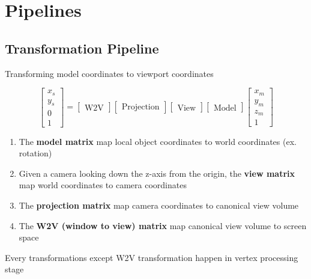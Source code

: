 \chapter{Pipelines}

\section{Transformation Pipeline}

  Transforming model coordinates to viewport coordinates

  \begin{equation}
    \begin{bmatrix}
      x_{s} \\
      y_{s} \\
      0 \\
      1
    \end{bmatrix}
    =
    \begin{bmatrix}
      \text{W2V}
    \end{bmatrix}
    \begin{bmatrix}
      \text{Projection}
    \end{bmatrix}
    \begin{bmatrix}
      \text{View}
    \end{bmatrix}
    \begin{bmatrix}
      \text{Model}
    \end{bmatrix}
    \begin{bmatrix}
      x_{m} \\
      y_{m} \\
      z_{m} \\
      1
    \end{bmatrix}
  \end{equation}

  \begin{enumerate}
    \item The \textbf{model matrix} map local object coordinates to
    world coordinates (ex. rotation)
    \item Given a camera looking down the z-axis from the origin,
    the \textbf{view matrix} map world coordinates to camera coordinates
    \item The \textbf{projection matrix} map camera coordinates to canonical
    view volume
    \item The \textbf{W2V (window to view) matrix} map canonical view volume
    to screen space
  \end{enumerate}

  Every transformations except W2V transformation happen in vertex
  processing stage

